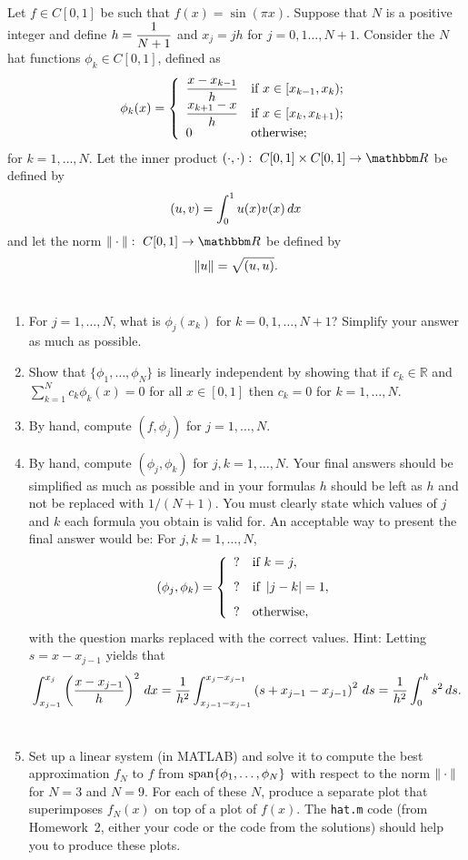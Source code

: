 
Let $f\in C[0,1]$ be such that $f(x) = \sin(\pi x)$. Suppose that $N$ is a positive integer and define $\displaystyle{h = {1\over N+1}}$ and $x_j = jh$ for $j = 0,1\ldots, N+1$. Consider the $N$ hat functions $\phi_k\in C[0,1]$, defined as
\[
\phi_k(x) = \left\{
\begin{array}{ll}
\displaystyle{{x-x_{k-1}\over h}} & \mbox{if }x\in [x_{k-1}, x_k);\\
\displaystyle{{x_{k+1}-x\over h}} & \mbox{if }x\in [x_k, x_{k+1});\\
0 & \mbox{otherwise};
\end{array}\right.
\]
for $k=1,\ldots, N$. Let the inner product $\ip{\cdot,\cdot}:\mbox{ }C[0,1]\times C[0,1]\rightarrow\R$ be defined by
\[
(u,v) = \int_0^1 u(x)v(x)\, dx
\]
and let the norm $\norm{\cdot}:\mbox{ }C[0,1]\rightarrow\R$ be defined by
\[
\|u\| = \sqrt{(u,u)}.
\]
\\
\begin{enumerate}
\item For $j=1,\ldots,N$, what is $\phi_j(x_k)$ for $k=0,1,\ldots,N+1$? Simplify your answer as much as possible.
\\
\item Show that $\{\phi_1, \ldots, \phi_N\}$ is linearly independent by showing that if $c_k\in\mathbb{R}$ and $\displaystyle{\sum_{k=1}^N}c_k\phi_k(x)=0$ for all $x\in[0,1]$ then $c_k=0$ for $k=1,\ldots,N$.
\\
\item By hand, compute $(f,\phi_j)$ for $j=1,\ldots, N$.
\\
\item By hand, compute $(\phi_j, \phi_k)$ for $j,k=1,\ldots, N$. Your final answers should be simplified as much as possible and in your formulas $h$ should be left as $h$ and not be replaced with $1/(N+1)$. You must clearly state which values of $j$ and $k$ each formula you obtain is valid for. An acceptable way to present the final answer would be:\newline
For $j,k=1,\ldots,N$,
\[
(\phi_j,\phi_k)=\left\{\begin{array}{ll}? & \mbox{if }k=j, \\[.75em] ? & \mbox{if }\left|j-k\right|=1, \\[.75em] ? & \mbox{otherwise},\end{array}\right.
\]
with the question marks replaced with the correct values. Hint: Letting $s=x-x_{j-1}$ yields that
\[
\int_{x_{j-1}}^{x_j}\left({x-x_{j-1}\over h}\right)^2\,dx={1 \over h^2}\int_{x_{j-1}-x_{j-1}}^{x_j-x_{j-1}}\left(s+x_{j-1}-x_{j-1}\right)^2\,ds={1 \over h^2}\int_0^hs^2\,ds.
\]
\\
\item Set up a linear system (in MATLAB) and solve it to compute the best approximation $f_N$ to $f$ from ${\rm span}\{\phi_1, \ldots, \phi_N\}$  with respect to the norm $\|\cdot\|$ for $N=3$ and $N=9$. For each of these $N$, produce a separate plot that superimposes $f_N(x)$ on top of a plot of $f(x)$. The \verb|hat.m| code (from Homework~2, either your code or the code from the solutions) should help you to produce these plots.
\end{enumerate}




